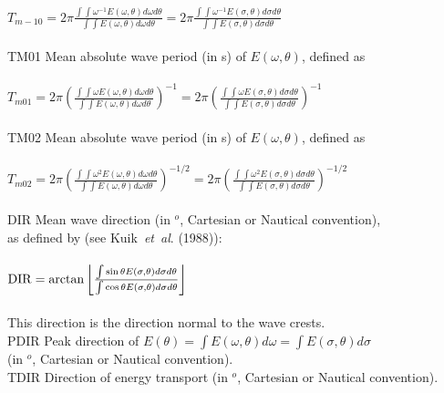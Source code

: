 \documentclass[12pt]{book}
\begin{document}
\begin{tabbing}
                        \\
$T_{m-10} = 2\pi \frac{\int \int \omega^{-1} E(\omega, \theta) d\omega d\theta}{\int \int E(\omega, \theta) d\omega d\theta} = 2\pi \frac{\int \int \omega^{-1} E(\sigma, \theta) d\sigma d\theta}{\int \int E(\sigma, \theta) d\sigma d\theta}$ \\
                        \-\\
TM01                 \> Mean absolute wave period (in s) of $E(\omega,\theta)$, defined as\+\\
                        \\
$T_{m01} = 2\pi \left(\frac{\int \int \omega E(\omega, \theta) d\omega d\theta}{\int \int E(\omega, \theta) d\omega d\theta} \right)^{-1} = 2\pi \left(\frac{\int \int \omega E(\sigma, \theta) d\sigma d\theta}{\int \int E(\sigma, \theta) d\sigma d\theta} \right)^{-1}$ \\
                        \-\\
TM02                 \> Mean absolute wave period (in s) of $E(\omega,\theta)$, defined as\+\\
                        \\
$T_{m02} = 2\pi \left(\frac{\int \int \omega^2 E(\omega, \theta) d\omega d\theta}{\int \int E(\omega, \theta) d\omega d\theta} \right)^{-1/2} = 2\pi \left(\frac{\int \int \omega^2 E(\sigma, \theta) d\sigma d\theta}{\int \int E(\sigma, \theta) d\sigma d\theta} \right)^{-1/2}$ \\
                        \-\\
DIR                  \> Mean wave direction (in $^o$, Cartesian or Nautical convention),\+\\
                        as defined by (see Kuik~{\it et~al}. (1988)):\\
                        \\
${\rm DIR} = \arctan \left\lfloor \frac{\int \sin \theta E(\sigma, \theta) d\sigma d\theta}{\int \cos \theta E(\sigma, \theta) d\sigma d\theta} \right\rfloor$ \\
                        \\
                        This direction is the direction normal to the wave crests.\-\\
PDIR                 \> Peak direction of $E(\theta) = \int E(\omega,\theta)d\omega = \int E(\sigma,\theta)d\sigma$\+\\
                        (in $^o$, Cartesian or Nautical convention).\-\\
TDIR                 \> Direction of energy transport (in $^o$, Cartesian or Nautical convention).\+\\

\end{tabbing}
\end{document}
